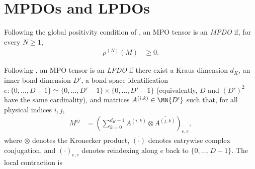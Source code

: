 \section{MPDOs and LPDOs}

\begin{definition}[MPDO]\label{def:mpdo}
    \leanok
    Following the global positivity condition of
    \cite[Section~4]{Cirac2016MPDO_arXiv}, an MPO tensor is an \emph{MPDO}
    if, for every $N\geq1$,
    \begin{align}
        \rho^{(N)}(M)
         & \ge0.
        \label{eq:mpdo_positivity}
    \end{align}
\end{definition}

\begin{definition}[LPDO]\label{def:lpdo}
    \leanok
    Following \cite[Section~4.3]{Cirac2016MPDO_arXiv}, an MPO tensor is an
    \emph{LPDO} if there exist a Kraus dimension $d_K$,
    an inner bond dimension $D'$, a bond-space identification
    $e:\{0,\ldots,D-1\}\simeq
        \{0,\ldots,D'-1\}\times\{0,\ldots,D'-1\}$
    (equivalently, $D$ and $(D')^2$
    have the same cardinality), and matrices $A^{(i,k)}\in\MN{D'}$ such that,
    for all physical indices $i,j$,
    \begin{align}
        M^{ij}
         & =
        \left(\sum_{k=0}^{d_K-1}
        A^{(i,k)}\otimes\overline{A^{(j,k)}}\right)_{e,e},
        \label{eq:mpdo_lpdo_factorization}
    \end{align}
    where $\otimes$ denotes the Kronecker product, $\overline{(\cdot)}$
    denotes entrywise complex conjugation, and $(\cdot)_{e,e}$ denotes
    reindexing along $e$ back to $\{0,\ldots,D-1\}$.
    The local contraction is
    \begin{tenkzequation}
        \tenkzkernel

\end{tenkzequation}
\end{definition}
